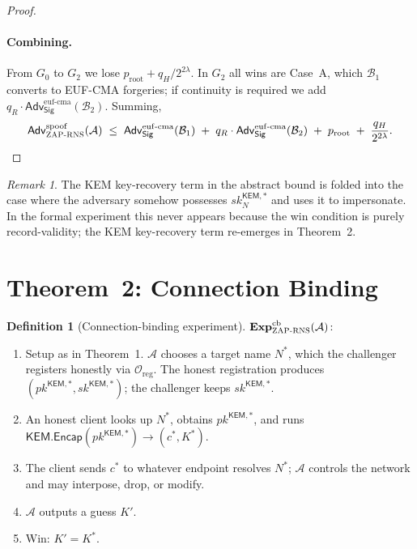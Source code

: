 \documentclass[11pt,a4paper]{article}
\theoremstyle{definition}
\newtheorem{definition}{Definition}
\theoremstyle{remark}
\newtheorem{remark}{Remark}
\newcommand{\KEM}{\mathsf{KEM}}
\newcommand{\Sig}{\mathsf{Sig}}
\newcommand{\Adv}{\mathsf{Adv}}
\newcommand{\Encap}{\mathsf{Encap}}
\newcommand{\pk}{\mathit{pk}}
\newcommand{\sk}{\mathit{sk}}
\newcommand{\RNS}{\textsc{ZAP-RNS}}
\begin{document}
\begin{proof}
\paragraph{Combining.} From $G_0$ to $G_2$ we lose
$p_{\mathrm{root}} + q_H/2^{2\lambda}$. In $G_2$ all wins are Case~A,
which $\mathcal{B}_1$ converts to EUF-CMA forgeries; if continuity is
required we add $q_R \cdot \Adv^{\mathrm{euf\text{-}cma}}_{\Sig}(\mathcal{B}_2)$.
Summing,
\[
\Adv^{\mathrm{spoof}}_{\RNS}(\mathcal{A}) \;\le\;
\Adv^{\mathrm{euf\text{-}cma}}_{\Sig}(\mathcal{B}_1) \;+\;
q_R \cdot \Adv^{\mathrm{euf\text{-}cma}}_{\Sig}(\mathcal{B}_2) \;+\;
p_{\mathrm{root}} \;+\; \frac{q_H}{2^{2\lambda}}. \qedhere
\]
\end{proof}

\begin{remark}
The KEM key-recovery term in the abstract bound is folded into the
case where the adversary somehow possesses $\sk^{\KEM,*}_N$ and uses
it to impersonate. In the formal experiment this never appears
because the win condition is purely record-validity; the KEM
key-recovery term re-emerges in Theorem~2.
\end{remark}

\section{Theorem~2: Connection Binding}

\begin{definition}[Connection-binding experiment]
$\mathbf{Exp}^{\mathrm{cb}}_{\RNS}(\mathcal{A})$:
\begin{enumerate}[leftmargin=*,label=\arabic*.]
\item Setup as in Theorem~1. $\mathcal{A}$ chooses a target name $N^*$,
which the challenger registers honestly via $\mathcal{O}_{\mathrm{reg}}$.
The honest registration produces $(\pk^{\KEM,*}, \sk^{\KEM,*})$; the
challenger keeps $\sk^{\KEM,*}$.
\item An honest client looks up $N^*$, obtains $\pk^{\KEM,*}$, and
runs $\KEM.\Encap(\pk^{\KEM,*}) \to (c^*, K^*)$.
\item The client sends $c^*$ to whatever endpoint resolves $N^*$;
$\mathcal{A}$ controls the network and may interpose, drop, or modify.
\item $\mathcal{A}$ outputs a guess $K'$.
\item Win: $K' = K^*$.
\end{enumerate}
\end{definition}
\end{document}
